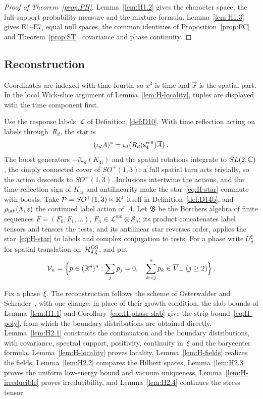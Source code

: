 \begin{proof}[Proof of Theorem~\ref{prop:PH}]
Lemma~\ref{lem:H1.2} gives the character space, the full-support probability measure and the mixture formula. Lemma~\ref{lem:H1.3} gives E1--E7, equal null spaces, the common identities of Proposition~\ref{prop:FC} and Theorem~\ref{prop:ST}, covariance and phase continuity.
\end{proof}

\subsection{Reconstruction}\label{sec:partII-H.2}

Coordinates are indexed with time fourth, so $x^4$ is time and $\vec x$ is the spatial part. In the local Wick-slice argument of Lemma~\ref{lem:H-locality}, tuples are displayed with the time component first.

Use the response labels~$\mathcal L$ of Definition~\ref{def:D10}. With time reflection acting on labels through~$R_d$, the star is
\begin{equation}\label{eq:H-star}
(\iota_dA)^*=\iota_d\bigl(R_d(\mathsf s_4^{\rm refl})\overline A\bigr)\,.
\end{equation}
The boost generators $-i\mathsf L_d(K_{4i})$ and the spatial rotations integrate to $SL(2,\mathbb{C})$, the simply connected cover of $SO^+(1,3)$; a full spatial turn acts trivially, so the action descends to $SO^+(1,3)$. Inclusions intertwine the actions, and the time-reflection sign of $K_{4i}$ and antilinearity make the star~\eqref{eq:H-star} commute with boosts. Take $\mathcal P=SO^+(1,3)\ltimes\mathbb{R}^4$ itself in Definition~\ref{def:D14b}, and $\rho_{\rm lab}(\Lambda,z)$ the continued label action of~$\Lambda$. Let $\mathfrak B$ be the Borchers algebra of finite sequences $F=(F_0,F_1,\ldots)$, $F_n\in\mathcal L^{\otimes n}\otimes\mathcal S_n$; its product concatenates label tensors and tensors the tests, and its antilinear star reverses order, applies the star~\eqref{eq:H-star} to labels and complex conjugation to tests. For a phase write $U_y^\xi$ for spatial translation on~$\mathcal H_{4,\xi}^{\rm OS}$, and put
\begin{equation*}
\mathcal V_n=\Bigl\{p\in(\mathbb{R}^4)^n:\sum_jp_j=0,\quad \sum_{k=j}^np_k\in\overline{V}_+\ (j\ge2)\Bigr\}\,.
\end{equation*}

Fix a phase~$\xi$. The reconstruction follows the scheme of Osterwalder and Schrader~\cite{OsterwalderSchrader1973,OsterwalderSchrader1975}, with one change: in place of their growth condition, the slab bounds of Lemma~\ref{lem:H1.1} and Corollary~\ref{cor:H-phase-slab} give the strip bound~\eqref{eq:H-poly}, from which the boundary distributions are obtained directly. Lemma~\ref{lem:H2.1} constructs the continuation and the boundary distributions, with covariance, spectral support, positivity, continuity in~$\xi$ and the barycenter formula. Lemma~\ref{lem:H-locality} proves locality, Lemma~\ref{lem:H-fields} realizes the fields, Lemma~\ref{lem:H2.2} compares the Hilbert spaces, Lemma~\ref{lem:H2.3} proves the uniform low-energy bound and vacuum uniqueness, Lemma~\ref{lem:H-irreducible} proves irreducibility, and Lemma~\ref{lem:H2.4} continues the stress tensor.

